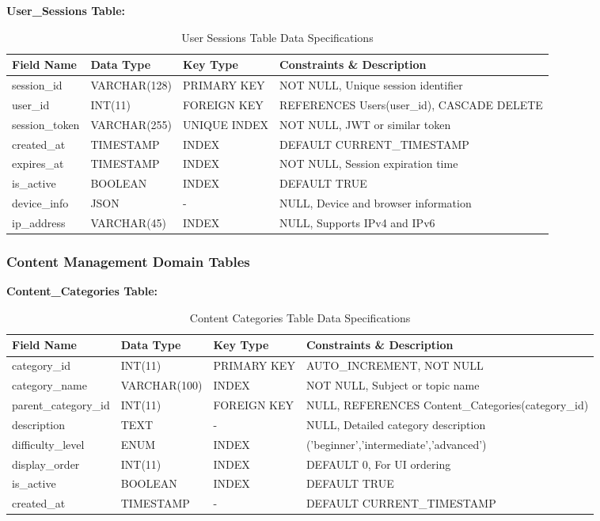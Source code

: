 \documentclass[12pt,a4paper,oneside]{book}
\begin{document}
\textbf{User\_Sessions Table:}
\begin{table}[H]
\centering
\caption{User Sessions Table Data Specifications}
\footnotesize
\begin{tabular}{|L{3cm}|L{2.5cm}|L{1.5cm}|L{5cm}|}
\hline
\textbf{Field Name} & \textbf{Data Type} & \textbf{Key Type} & \textbf{Constraints \& Description} \\
\hline
session\_id & VARCHAR(128) & PRIMARY KEY & NOT NULL, Unique session identifier \\
\hline
user\_id & INT(11) & FOREIGN KEY & REFERENCES Users(user\_id), CASCADE DELETE \\
\hline
session\_token & VARCHAR(255) & UNIQUE INDEX & NOT NULL, JWT or similar token \\
\hline
created\_at & TIMESTAMP & INDEX & DEFAULT CURRENT\_TIMESTAMP \\
\hline
expires\_at & TIMESTAMP & INDEX & NOT NULL, Session expiration time \\
\hline
is\_active & BOOLEAN & INDEX & DEFAULT TRUE \\
\hline
device\_info & JSON & - & NULL, Device and browser information \\
\hline
ip\_address & VARCHAR(45) & INDEX & NULL, Supports IPv4 and IPv6 \\
\hline
\end{tabular}
\end{table}

\subsubsection{Content Management Domain Tables}

\textbf{Content\_Categories Table:}
\begin{table}[H]
\centering
\caption{Content Categories Table Data Specifications}
\footnotesize
\begin{tabular}{|L{3cm}|L{2.5cm}|L{1.5cm}|L{5cm}|}
\hline
\textbf{Field Name} & \textbf{Data Type} & \textbf{Key Type} & \textbf{Constraints \& Description} \\
\hline
category\_id & INT(11) & PRIMARY KEY & AUTO\_INCREMENT, NOT NULL \\
\hline
category\_name & VARCHAR(100) & INDEX & NOT NULL, Subject or topic name \\
\hline
parent\_category\_id & INT(11) & FOREIGN KEY & NULL, REFERENCES Content\_Categories(category\_id) \\
\hline
description & TEXT & - & NULL, Detailed category description \\
\hline
difficulty\_level & ENUM & INDEX & ('beginner','intermediate','advanced') \\
\hline
display\_order & INT(11) & INDEX & DEFAULT 0, For UI ordering \\
\hline
is\_active & BOOLEAN & INDEX & DEFAULT TRUE \\
\hline
created\_at & TIMESTAMP & - & DEFAULT CURRENT\_TIMESTAMP \\
\hline
\end{tabular}
\end{table}
\end{document}
